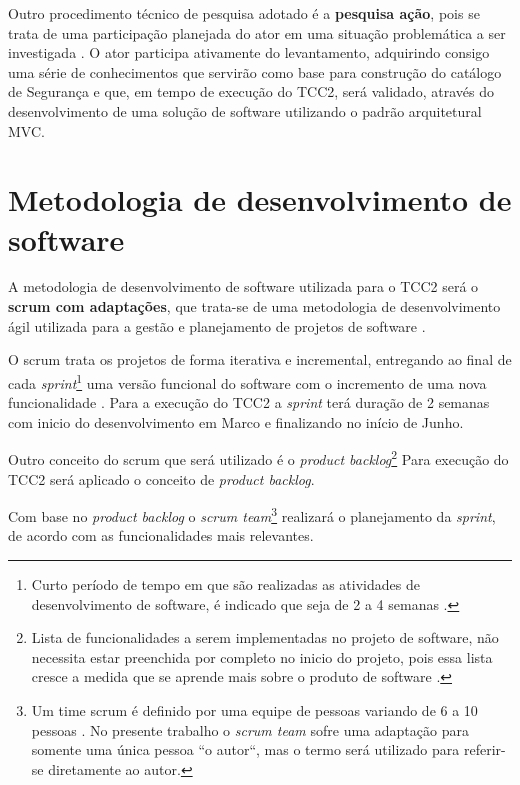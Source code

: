Outro procedimento técnico de pesquisa adotado é a \textbf{pesquisa ação}, pois se trata de uma participação planejada do ator em uma situação problemática a ser investigada \cite{fonseca2002metodologia}. O ator participa ativamente do levantamento, adquirindo consigo uma série de conhecimentos que servirão como base para construção do catálogo de Segurança e que, em tempo de execução do TCC2, será validado, através do desenvolvimento de uma solução de software utilizando o padrão arquitetural MVC. 

\section{Metodologia de desenvolvimento de software}
\label{sec:metodologiaDeDesenvolvimentoDeSoftware}

A metodologia de desenvolvimento de software utilizada para o TCC2 será o \textbf{scrum com adaptações}, que trata-se de uma metodologia de desenvolvimento ágil utilizada para a gestão e planejamento de projetos de software \cite{schwaber2002agile}. 

\pagebreak

O scrum trata os projetos de forma iterativa e incremental, entregando ao final de cada \textit{sprint}\footnote[1]{Curto período de tempo em que são realizadas as atividades de desenvolvimento de software, é indicado que seja de 2 a 4 semanas \cite{schwaber2002agile}.} uma versão funcional do software com o incremento de uma nova funcionalidade \cite{schwaber2002agile}. Para a execução do TCC2 a \textit{sprint} terá duração de 2 semanas com inicio do desenvolvimento em Marco e finalizando no início de Junho. 

Outro conceito do scrum que será utilizado é o \textit{product backlog}\footnote[2]{Lista de funcionalidades a serem implementadas no projeto de software, não necessita estar preenchida por completo no inicio do projeto, pois essa lista cresce a medida que se aprende mais sobre o produto de software \cite{schwaber2002agile}.} Para execução do TCC2 será aplicado o conceito de \textit{product backlog}.

Com base no \textit{product backlog} o \textit{scrum team}\footnote[3]{Um time scrum é definido por uma equipe de pessoas variando de 6 a 10 pessoas \cite{schwaber2002agile}. No presente trabalho o \textit{scrum team} sofre uma adaptação para somente uma única pessoa ``o autor``, mas o termo será utilizado para referir-se diretamente ao autor.} realizará o planejamento da \textit{sprint}, de acordo com as funcionalidades mais relevantes. 

